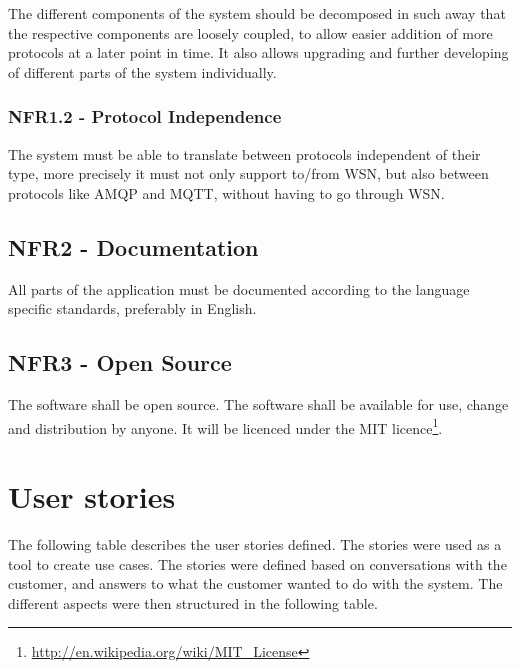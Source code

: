 The different components of the system should be decomposed in such away that the respective components are loosely coupled, to allow easier addition of more protocols at a later point in time. It also allows upgrading and further developing of different parts of the system individually.

\subsubsection{NFR1.2 - Protocol Independence}
\label{subsec:requirements_engineering-non_functional_requirements-protocol_independence}

The system must be able to translate between protocols independent of their type, more precisely it must not only support to/from WSN, but also between protocols like AMQP and MQTT, without having to go through WSN.

\subsection{NFR2 - Documentation}
\label{subsec:requirements_engineering-non_functional_requirements-documentation}

All parts of the application must be documented according to the language specific standards, preferably in English.

\subsection{NFR3 - Open Source}
\label{subsec:requirements_engineering-non_functional_requirements-open_source}

The software shall be open source. The software shall be available for use, change and distribution by anyone. It will be licenced under the MIT licence\footnote{\url{http://en.wikipedia.org/wiki/MIT_License}}.

\section{User stories}
\label{sec:requirements_engineering-user_stories}

The following table describes the user stories defined. The stories were used as a tool to create use cases. The stories were defined based on conversations with the customer, and answers to what the customer wanted to do with the system. The different aspects were then structured in the following table. 

\clearpage

